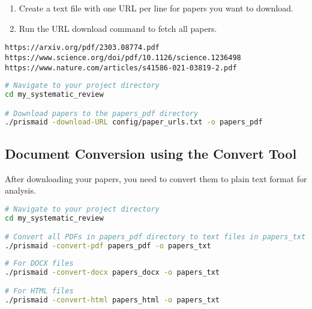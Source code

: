 \begin{enumerate}
    \item Create a text file with one URL per line for papers you want to download.
    \item Run the URL download command to fetch all papers.
\end{enumerate}

\begin{commandbox}
\begin{lstlisting}
https://arxiv.org/pdf/2303.08774.pdf
https://www.science.org/doi/pdf/10.1126/science.1236498
https://www.nature.com/articles/s41586-021-03819-2.pdf
\end{lstlisting}
\end{commandbox}

\begin{commandbox}
\begin{lstlisting}[language=Bash]
# Navigate to your project directory
cd my_systematic_review

# Download papers to the papers_pdf directory
./prismaid -download-URL config/paper_urls.txt -o papers_pdf
\end{lstlisting}
\end{commandbox}


\subsection{Document Conversion using the Convert Tool}

After downloading your papers, you need to convert them to plain text format for analysis.

\begin{commandbox}
\begin{lstlisting}[language=Bash]
# Navigate to your project directory
cd my_systematic_review

# Convert all PDFs in papers_pdf directory to text files in papers_txt
./prismaid -convert-pdf papers_pdf -o papers_txt
\end{lstlisting}
\end{commandbox}

\begin{commandbox}
\begin{lstlisting}[language=Bash]
# For DOCX files
./prismaid -convert-docx papers_docx -o papers_txt

# For HTML files
./prismaid -convert-html papers_html -o papers_txt
\end{lstlisting}
\end{commandbox}

